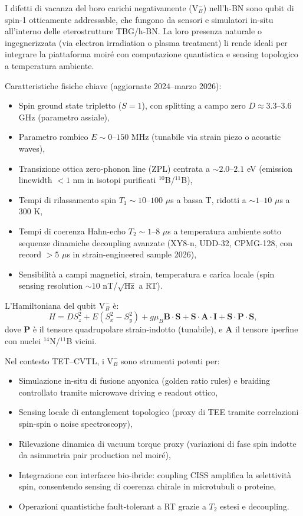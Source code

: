 \documentclass[11pt,a4paper]{article}
\theoremstyle{plain}
\theoremstyle{definition}
\begin{document}
I difetti di vacanza del boro carichi negativamente ($\mathrm{V}_B^-$) nell'h-BN sono qubit di spin-1 otticamente addressable, che fungono da sensori e simulatori in-situ all'interno delle eterostrutture TBG/h-BN. La loro presenza naturale o ingegnerizzata (via electron irradiation o plasma treatment) li rende ideali per integrare la piattaforma moiré con computazione quantistica e sensing topologico a temperatura ambiente.

Caratteristiche fisiche chiave (aggiornate 2024--marzo 2026):
\begin{itemize}
    \item Spin ground state tripletto ($S=1$), con splitting a campo zero $D \approx 3.3$--$3.6$ GHz (parametro assiale),
    \item Parametro rombico $E \sim 0$--$150$ MHz (tunabile via strain piezo o acoustic waves),
    \item Transizione ottica zero-phonon line (ZPL) centrata a $\sim 2.0$--$2.1$ eV (emission linewidth $< 1$ nm in isotopi purificati $^{10}$B/$^{11}$B),
    \item Tempi di rilassamento spin $T_1 \sim 10$--$100$ $\mu$s a bassa T, ridotti a $\sim 1$--$10$ $\mu$s a 300 K,
    \item Tempi di coerenza Hahn-echo $T_2 \sim 1$--$8$ $\mu$s a temperatura ambiente sotto sequenze dinamiche decoupling avanzate (XY8-n, UDD-32, CPMG-128, con record $>5$ $\mu$s in strain-engineered sample 2026),
    \item Sensibilità a campi magnetici, strain, temperatura e carica locale (spin sensing resolution $\sim 10$ nT/$\sqrt{\mathrm{Hz}}$ a RT).
\end{itemize}

L'Hamiltoniana del qubit $\mathrm{V}_B^-$ è:
\begin{equation}
H = D S_z^2 + E (S_x^2 - S_y^2) + g \mu_B \mathbf{B} \cdot \mathbf{S} + \mathbf{S} \cdot \mathbf{A} \cdot \mathbf{I} + \mathbf{S} \cdot \mathbf{P} \cdot \mathbf{S},
\end{equation}
dove $\mathbf{P}$ è il tensore quadrupolare strain-indotto (tunabile), e $\mathbf{A}$ il tensore iperfine con nuclei $^{14}$N/$^{11}$B vicini.

Nel contesto TET--CVTL, i $\mathrm{V}_B^-$ sono strumenti potenti per:
\begin{itemize}
    \item Simulazione in-situ di fusione anyonica (golden ratio rules) e braiding controllato tramite microwave driving e readout ottico,
    \item Sensing locale di entanglement topologico (proxy di TEE tramite correlazioni spin-spin o noise spectroscopy),
    \item Rilevazione dinamica di vacuum torque proxy (variazioni di fase spin indotte da asimmetria pair production nel moiré),
    \item Integrazione con interfacce bio-ibride: coupling CISS amplifica la selettività spin, consentendo sensing di coerenza chirale in microtubuli o proteine,
    \item Operazioni quantistiche fault-tolerant a RT grazie a $T_2$ estesi e decoupling.
\end{itemize}
\end{document}
